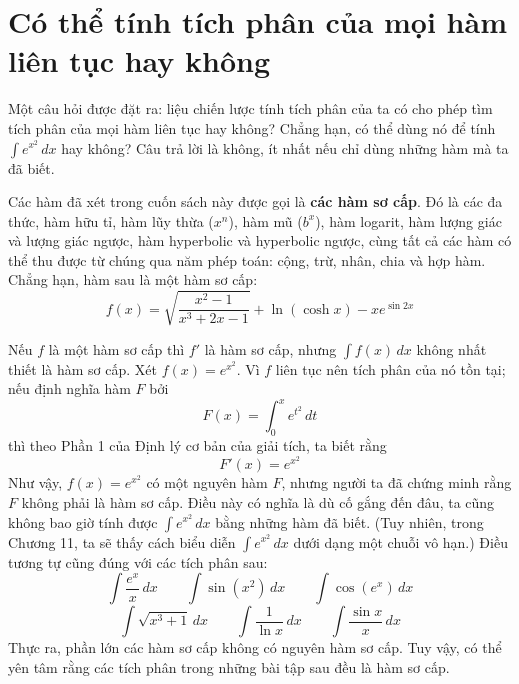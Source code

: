 \documentclass[12pt,a4paper]{article}
\begin{document}
\section*{Có thể tính tích phân của mọi hàm liên tục hay không}
Một câu hỏi được đặt ra: liệu chiến lược tính tích phân của ta có cho phép tìm tích phân của mọi hàm liên tục hay không? Chẳng hạn, có thể dùng nó để tính $\int e^{x^2}\,dx$ hay không? Câu trả lời là không, ít nhất nếu chỉ dùng những hàm mà ta đã biết.

Các hàm đã xét trong cuốn sách này được gọi là \textbf{các hàm sơ cấp}. Đó là các đa thức, hàm hữu tỉ, hàm lũy thừa ($x^n$), hàm mũ ($b^x$), hàm logarit, hàm lượng giác và lượng giác ngược, hàm hyperbolic và hyperbolic ngược, cùng tất cả các hàm có thể thu được từ chúng qua năm phép toán: cộng, trừ, nhân, chia và hợp hàm. Chẳng hạn, hàm sau là một hàm sơ cấp:
\[f(x)=\sqrt{\frac{x^2-1}{x^3+2x-1}}+\ln(\cosh x)-xe^{\sin2x}\]

Nếu $f$ là một hàm sơ cấp thì $f'$ là hàm sơ cấp, nhưng $\int f(x)\,dx$ không nhất thiết là hàm sơ cấp. Xét $f(x)=e^{x^2}$. Vì $f$ liên tục nên tích phân của nó tồn tại; nếu định nghĩa hàm $F$ bởi
\[F(x)=\int_0^x e^{t^2}\,dt\]
thì theo Phần 1 của Định lý cơ bản của giải tích, ta biết rằng
\[F'(x)=e^{x^2}\]
Như vậy, $f(x)=e^{x^2}$ có một nguyên hàm $F$, nhưng người ta đã chứng minh rằng $F$ không phải là hàm sơ cấp. Điều này có nghĩa là dù cố gắng đến đâu, ta cũng không bao giờ tính được $\int e^{x^2}\,dx$ bằng những hàm đã biết. (Tuy nhiên, trong Chương 11, ta sẽ thấy cách biểu diễn $\int e^{x^2}\,dx$ dưới dạng một chuỗi vô hạn.) Điều tương tự cũng đúng với các tích phân sau:
\[\int\frac{e^x}{x}\,dx\qquad\int\sin(x^2)\,dx\qquad\int\cos(e^x)\,dx\]
\[\int\sqrt{x^3+1}\,dx\qquad\int\frac1{\ln x}\,dx\qquad\int\frac{\sin x}{x}\,dx\]
Thực ra, phần lớn các hàm sơ cấp không có nguyên hàm sơ cấp. Tuy vậy, có thể yên tâm rằng các tích phân trong những bài tập sau đều là hàm sơ cấp.
\end{document}
